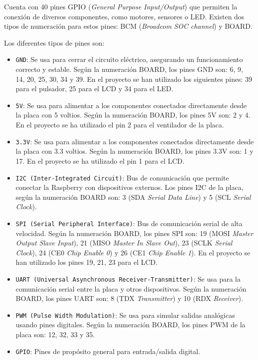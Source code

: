 Cuenta con 40 pines GPIO (\textit{General Purpose Input/Output}) que permiten la conexión de diversos componentes, como motores, sensores o LED. Existen dos tipos de numeración para estos pines: BCM (\textit{Broadcom SOC channel}) y BOARD.

Los diferentes tipos de pines son:

\begin{itemize}
	\item \texttt{GND}: Se usa para cerrar el circuito eléctrico, asegurando un funcionamiento correcto y estable.
	Según la numeración BOARD, los pines GND son: 6, 9, 14, 20, 25, 30, 34 y 39.
	En el proyecto se han utilizado los siguientes pines: 39 para el pulsador, 25 para el LCD y 34 para el LED.

	\item \texttt{5V}: Se usa para alimentar a los componentes conectados directamente desde la placa con 5 voltios.
	Según la numeración BOARD, los pines 5V  son: 2 y 4.
    En el proyecto se ha utilizado el pin 2 para el ventilador de la placa.

	\item \texttt{3.3V}: Se usa para alimentar a los componentes conectados directamente desde la placa con 3.3 voltios.
	Según la numeración BOARD, los pines 3.3V son: 1 y 17.
	En el proyecto se ha utilizado el pin 1 para el LCD.

    \item \texttt{I2C (Inter-Integrated Circuit)}: Bus de comunicación que permite conectar la Raspberry con dispositivos externos.
    Los pines I2C de la placa, según la numeración BOARD son: 3 (SDA  \textit{Serial Data Line}) y 5 (SCL \textit{Serial Clock}).


    \item \texttt{SPI (Serial Peripheral Interface)}: Bus de comunicación serial de alta velocidad.
    Según la numeración BOARD, los pines SPI son: 19 (MOSI \textit{Master Output Slave Input}), 21 (MISO \textit{Master In Slave Out}), 23 (SCLK \textit{Serial Clock}), 24 (CE0 \textit{Chip Enable 0}) y 26 (CE1 \textit{Chip Enable 1}).
    En el proyecto se han utilizado los pines 19, 21, 23 para el LCD.

    \item \texttt{UART (Universal Asynchronous Receiver-Transmitter)}: Se usa para la comunicación serial entre la placa y otros dispositivos.
    Según la numeración BOARD, los pines UART son: 8 (TDX \textit{Transmitter}) y 10 (RDX \textit{Receiver}).

    \item \texttt{PWM (Pulse Width Modulation)}: Se usa para simular salidas analógicas usando pines digitales.
    Según la numeración BOARD, los pines PWM de la placa son: 12, 32, 33 y 35.

    \item \texttt{GPIO}: Pines de propósito general para entrada/salida digital.

\end{itemize}


